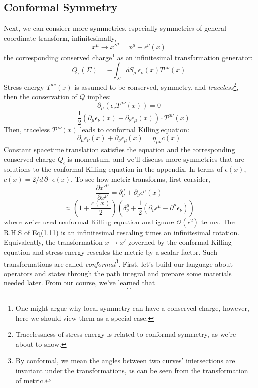 \documentclass[12pt]{article}
\numberwithin{equation}{section}
\newcommand\<\langle
\renewcommand\>\rangle
\renewcommand\.{\cdot}
\begin{document}
\subsection{Conformal Symmetry}
Next, we can consider more symmetries, especially symmetries of general coordinate transform, infinitesimally,
\begin{equation}
    x^{\mu}\rightarrow x'^{\mu} = x^{\mu} + \epsilon^{\nu}(x)
\end{equation}
the corresponding conserved charge\footnote{One might argue why local symmetry can have a conserved charge, however, here we should view them as a special case.} as an infinitesimal transformation generator:
\begin{equation}
    Q_{\epsilon}(\Sigma) = -\int_{\Sigma}{dS_{\mu}\,}\epsilon_{\nu}(x)T^{\mu\nu}(x)
\end{equation}
Stress energy $T^{\mu\nu}(x)$ is assumed to be conserved, symmetry, and \textit{traceless}\footnote{Tracelessness of stress energy is related to conformal symmetry, as we're about to show.}, then the conservation of $Q$ implies:
\[
    \partial_{\mu}(\epsilon_{\nu}T^{\mu\nu}(x)) = 0
\]
\[
    =\frac{1}{2}\left(\partial_{\mu}\epsilon_{\nu}(x)+\partial_{\nu}\epsilon_{\mu}(x)\right)\cdot T^{\mu\nu}(x)
\]
Then, traceless $T^{\mu\nu}(x)$ leads to conformal Killing equation:
\begin{equation}
    \partial_{\mu}\epsilon_{\nu}(x) + \partial_{\nu}\epsilon_{\mu}(x) = \eta_{\mu\nu}c(x)
\end{equation}
Constant spacetime translation satisfies the equation and the corresponding conserved charge $Q_{\epsilon}$ is momentum, and we'll discuss more symmetries that are solutions to the conformal Killing equation in the appendix. In terms of $\epsilon(x)$, $c(x) = 2/d\,\partial\cdot\epsilon(x)$. To see how metric transforms, first consider,
\[
    \frac{\partial x'^{\mu}}{\partial x^{\nu}} = \delta^{\mu}_{\nu} + \partial_{\nu}\epsilon^{\mu}(x)
\]
\begin{equation}
    \approx \left(1+\frac{c(x)}{2}\right)\left(\delta^{\mu}_{\nu} + \frac{1}{2}(\partial_{\nu}\epsilon^{\mu}-\partial^{\mu}\epsilon_{\nu})\right)
\end{equation}
where we've used conformal Killing equation and ignore $\mathcal{O}(\epsilon^2)$ terms. The R.H.S of Eq(1.11) is an infinitesimal rescaling times an infinitesimal rotation. Equivalently, the transformation $x\rightarrow x'$ governed by the conformal Killing equation and stress energy rescales the metric by a scalar factor. Such transformations are called \textit{conformal}\footnote{By conformal, we mean the angles between two curves' intersections are invariant under the transformations, as can be seen from the transformation of metric.}.
First, let’s build our language about operators and states through the path integral and prepare some materials needed later. From our course, we’ve learned that
\begin{equation}
\label{eq1}
\ldots
\end{equation}
\end{document}
